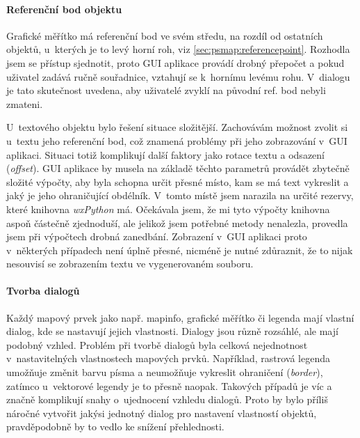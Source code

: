\documentclass[a4paper,12pt,draft]{article}
\begin{document}
 \paragraph*{Referenční bod objektu}
 Grafické měřítko má referenční bod ve svém středu, na rozdíl
 od ostatních objektů, u~kterých je to levý horní roh, viz
 \ref{sec:psmap:referencepoint}. Rozhodla jsem se přístup sjednotit,
 proto GUI aplikace provádí drobný přepočet a pokud uživatel zadává
 ručně souřadnice, vztahují se k~hornímu levému rohu. V~dialogu je
 tato skutečnost uvedena, aby uživatelé zvyklí na původní ref. bod
 nebyli zmateni.

 U~textového objektu bylo řešení situace složitější. Zachovávám
 možnost zvolit si u~textu jeho referenční bod, což znamená problémy
 při jeho zobrazování v~GUI aplikaci. Situaci totiž komplikují další
 faktory jako rotace textu a odsazení (\emph{offset}).
 GUI aplikace by musela na základě těchto parametrů provádět zbytečně
 složité výpočty, aby byla schopna určit přesné místo, kam se
 má text vykreslit a jaký je jeho ohraničující obdélník. V~tomto
 místě jsem narazila na určité rezervy, které knihovna \emph{wxPython}
 má. Očekávala jsem, že mi tyto výpočty knihovna aspoň částečně
 zjednoduší, ale jelikož jsem potřebné metody nenalezla, provedla
 jsem při výpočtech drobná zanedbání. Zobrazení v~GUI aplikaci proto
 v~některých případech není úplně přesné, nicméně je nutné
 zdůraznit, že to nijak nesouvisí se zobrazením textu ve  vygenerovaném
 souboru.

 \paragraph*{Tvorba dialogů}
 Každý mapový prvek jako např. mapinfo, grafické měřítko či legenda
 mají vlastní dialog, kde se nastavují jejich vlastnosti. Dialogy jsou
 různě rozsáhlé, ale mají podobný vzhled. Problém při tvorbě
 dialogů byla celková nejednotnost v~nastavitelných vlastnostech
 mapových prvků. Například, rastrová legenda umožňuje změnit barvu písma a
 neumožňuje vykreslit ohraničení (\emph{border}), zatímco u~vektorové
 legendy je to přesně naopak. Takových případů je víc a značně
 komplikují snahy o~ujednocení vzhledu dialogů. Proto by bylo příliš
 náročné vytvořit jakýsi jednotný dialog pro nastavení vlastností
 objektů, pravděpodobně by to vedlo ke snížení přehlednosti.
\end{document}
